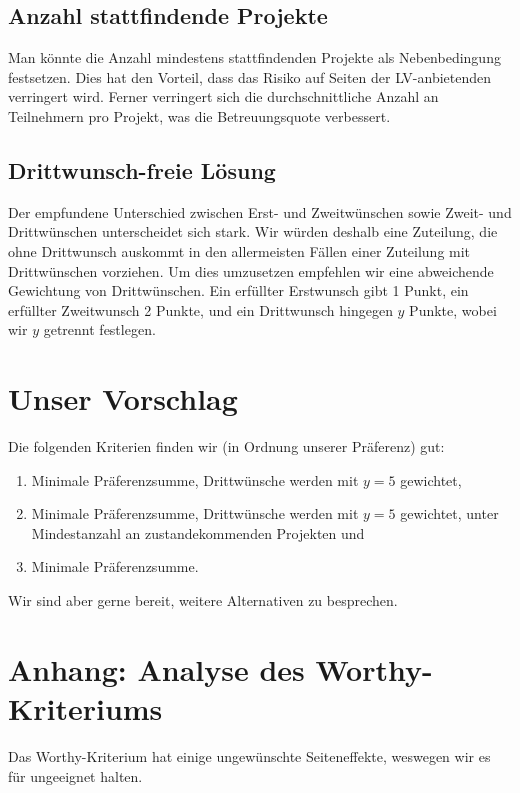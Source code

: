 \documentclass[11pt,a4paper]{article}
\begin{document}
\subsection{Anzahl stattfindende Projekte}
Man könnte die Anzahl mindestens stattfindenden Projekte als Nebenbedingung festsetzen. Dies hat den Vorteil, dass das Risiko auf Seiten der LV-anbietenden verringert wird. Ferner verringert sich die durchschnittliche Anzahl an Teilnehmern pro Projekt, was die Betreuungsquote verbessert.


\subsection{Drittwunsch-freie Lösung}
Der empfundene Unterschied zwischen Erst- und Zweitwünschen sowie Zweit- und Drittwünschen unterscheidet sich stark. Wir würden deshalb eine Zuteilung, die ohne Drittwunsch auskommt in den allermeisten Fällen einer Zuteilung mit Drittwünschen vorziehen. Um dies umzusetzen empfehlen wir eine abweichende Gewichtung von Drittwünschen. Ein erfüllter Erstwunsch gibt 1 Punkt, ein erfüllter Zweitwunsch 2 Punkte, und ein Drittwunsch hingegen $y$ Punkte, wobei wir $y$ getrennt festlegen.

\section{Unser Vorschlag}
Die folgenden Kriterien finden wir (in Ordnung unserer Präferenz) gut:
\begin{enumerate}[noitemsep]
    \item Minimale Präferenzsumme, Drittwünsche werden mit $y=5$ gewichtet,
    \item Minimale Präferenzsumme, Drittwünsche werden mit $y=5$ gewichtet, unter Mindestanzahl an zustandekommenden Projekten und
    \item Minimale Präferenzsumme.
\end{enumerate}

Wir sind aber gerne bereit, weitere Alternativen zu besprechen.

\appendix
\section{Anhang: Analyse des Worthy-Kriteriums}
Das Worthy-Kriterium hat einige ungewünschte Seiteneffekte, weswegen wir es für ungeeignet halten.
\end{document}
